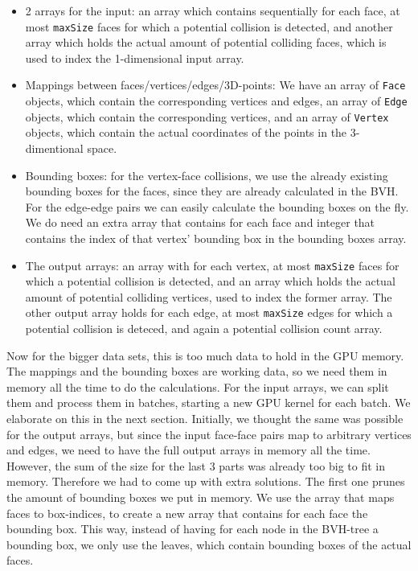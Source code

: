 \begin{itemize}
	\item 2 arrays for the input: an array which contains sequentially for each face, at most \texttt{maxSize} faces for which a potential collision is detected, and another array which holds the actual amount of potential colliding faces, which is used to index the 1-dimensional input array.
	\item Mappings between faces/vertices/edges/3D-points: We have an array of \texttt{Face} objects, which contain the corresponding vertices and edges, an array of \texttt{Edge} objects, which contain the corresponding vertices, and an array of \texttt{Vertex} objects, which contain the actual coordinates of the points in the 3-dimentional space.
	\item Bounding boxes: for the vertex-face collisions, we use the already existing bounding boxes for the faces, since they are already calculated in the BVH. For the edge-edge pairs we can easily calculate the bounding boxes on the fly. We do need an extra array that contains for each face and integer that contains the index of that vertex' bounding box in the bounding boxes array.
	\item The output arrays: an array with for each vertex, at most \texttt{maxSize} faces for which a potential collision is detected, and an array which holds the actual amount of potential colliding vertices, used to index the former array. The other output array holds for each edge, at most \texttt{maxSize} edges for which a potential collision is deteced, and again a potential collision count array.
\end{itemize}

Now for the bigger data sets, this is too much data to hold in the GPU memory. The mappings and the bounding boxes are working data, so we need them in memory all the time to do the calculations. For the input arrays, we can split them and process them in batches, starting a new GPU kernel for each batch. We elaborate on this in the next section. Initially, we thought the same was possible for the output arrays, but since the input face-face pairs map to arbitrary vertices and edges, we need to have the full output arrays in memory all the time.\\

However, the sum of the size for the last 3 parts was already too big to fit in memory. Therefore we had to come up with extra solutions. The first one prunes the amount of bounding boxes we put in memory. We use the array that maps faces to box-indices, to create a new array that contains for each face the bounding box. This way, instead of having for each node in the BVH-tree a bounding box, we only use the leaves, which contain bounding boxes of the actual faces.\\

